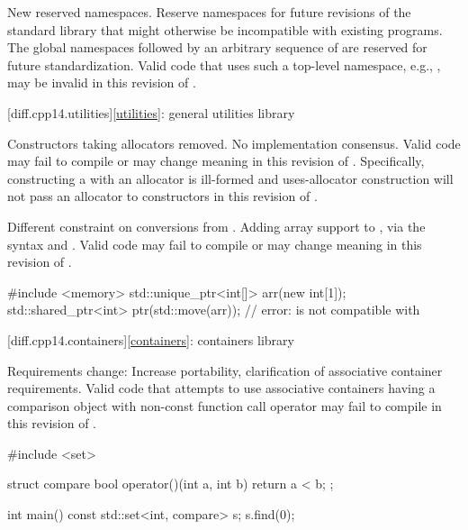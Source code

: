 \change
New reserved namespaces.
\rationale
Reserve namespaces for future revisions of the standard library
that might otherwise be incompatible with existing programs.
\effect
The global namespaces 
followed by an arbitrary sequence of 
are reserved for future standardization.
Valid \CppXIV{} code that uses such a top-level namespace,
e.g., , may be invalid in this revision of \Cpp{}.

[diff.cpp14.utilities]{\ref*{utilities}: general utilities library}

\change
Constructors taking allocators removed.
\rationale
No implementation consensus.
\effect
Valid \CppXIV{} code may fail to compile or may change meaning in this
revision of \Cpp{}. Specifically, constructing a  with
an allocator is ill-formed and uses-allocator construction will not pass an
allocator to  constructors in this revision of \Cpp{}.

\change
Different constraint on conversions from .
\rationale
Adding array support to ,
via the syntax  and .
\effect
Valid \CppXIV{} code may fail to compile or may change meaning in this
revision of \Cpp{}.
\begin{example}
\begin{codeblock}
#include <memory>
std::unique_ptr<int[]> arr(new int[1]);
std::shared_ptr<int> ptr(std::move(arr));   // error:  is not compatible with 
\end{codeblock}
\end{example}

[diff.cpp14.containers]{\ref*{containers}: containers library}

\change
Requirements change:
\rationale
Increase portability, clarification of associative container requirements.
\effect
Valid \CppXIV{} code that attempts to use associative containers
having a comparison object with non-const function call operator
may fail to compile in this revision of \Cpp{}.
\begin{example}
\begin{codeblock}
#include <set>

struct compare
{
  bool operator()(int a, int b)
  {
    return a < b;
  }
};

int main() {
  const std::set<int, compare> s;
  s.find(0);
}
\end{codeblock}
\end{example}

